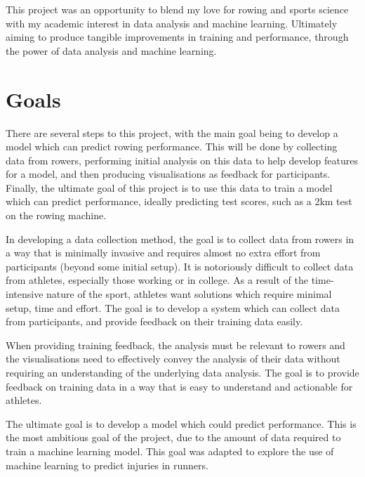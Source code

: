 This project was an opportunity to blend my love for rowing and sports science with my academic interest in data analysis and machine learning. Ultimately aiming to produce tangible improvements in training and performance, through the power of data analysis and machine learning.


\section{Goals}
There are several steps to this project, with the main goal being to develop a model which can predict rowing performance. This will be done by collecting data from rowers, performing initial analysis on this data to help develop features for a model, and then producing visualisations as feedback for participants. Finally, the ultimate goal of this project is to use this data to train a model which can predict performance, ideally predicting test scores, such as a 2km test on the rowing machine.

In developing a data collection method, the goal is to collect data from rowers in a way that is minimally invasive and requires almost no extra effort from participants (beyond some initial setup). It is notoriously difficult to collect data from athletes, especially those working or in college. As a result of the time-intensive nature of the sport, athletes want solutions which require minimal setup, time and effort. The goal is to develop a system which can collect data from participants, and provide feedback on their training data easily.

When providing training feedback, the analysis must be relevant to rowers and the visualisations need to effectively convey the analysis of their data without requiring an understanding of the underlying data analysis. The goal is to provide feedback on training data in a way that is easy to understand and actionable for athletes.

The ultimate goal is to develop a model which could predict performance. This is the most ambitious goal of the project, due to the amount of data required to train a machine learning model. This goal was adapted to explore the use of machine learning to predict injuries in runners.


